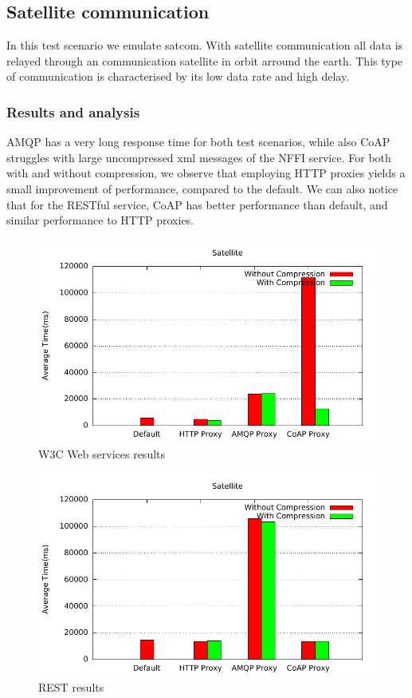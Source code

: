 \subsection{Satellite communication}

In this test scenario we emulate \gls{satcom}. With satellite communication
all data is relayed through an communication satellite in orbit arround
the earth. This type of communication is characterised by its low data rate
and high delay.

\subsubsection{Results and analysis}

AMQP has a very long response time for both test scenarios, while also CoAP
struggles with large uncompressed xml messages of the NFFI service. For both
with and without compression, we observe that employing HTTP proxies yields a
small improvement of performance, compared to the default. We can also notice
that for the RESTful service, CoAP has better performance than default, and
similar performance to HTTP proxies.

\begin{figure}[H]
\center
\includegraphics[scale=0.75]{../results/satellite/nffi/out.pdf}
\caption{W3C Web services results}
\end{figure}

\begin{figure}[H]
\center
\includegraphics[scale=0.75]{../results/satellite/rest/out.pdf}
\caption{REST results}
\end{figure}

